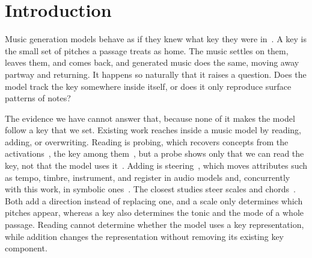 \documentclass{article}
\begin{document}
\section{Introduction}
Music generation models behave as if they knew what key they were in~\cite{hadjeres2017deepbach,huang2019musictransformer,copet2023musicgen}.
A key is the small set of pitches a passage treats as home.
The music settles on them, leaves them, and comes back, and generated music does the same, moving away partway and returning.
It happens so naturally that it raises a question.
Does the model track the key somewhere inside itself, or does it only reproduce surface patterns of notes?

The evidence we have cannot answer that, because none of it makes the model follow a key that we set.
Existing work reaches inside a music model by reading, adding, or overwriting.
Reading is probing, which recovers concepts from the activations~\cite{syntheory2024,mcgrath2022chess,ma2024root}, the key among them~\cite{castellon2021calm}, but a probe shows only that we can read the key, not that the model uses it~\cite{hewitt2019control,belinkov2022probing}.
Adding is steering~\cite{li2023iti,zou2023repe}, which moves attributes such as tempo, timbre, instrument, and register in audio models and, concurrently with this work, in symbolic ones~\cite{smitin2024,koo2024heads,facchiano2025patching,panda2025finegrained,mimidi2026,prokopiou2026latent}.
The closest studies steer scales and chords~\cite{musicrfm2026,singh2026discovering}.
Both add a direction instead of replacing one, and a scale only determines which pitches appear, whereas a key also determines the tonic and the mode of a whole passage.
Reading cannot determine whether the model uses a key representation, while addition changes the representation without removing its existing key component.
\end{document}
